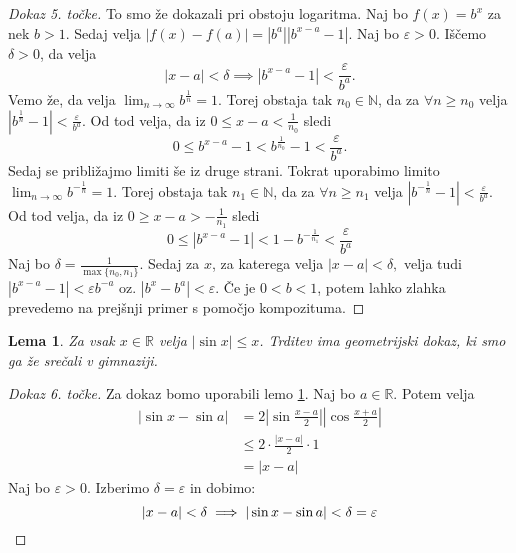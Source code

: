 \documentclass[10pt, a4paper]{article}
\newtheorem{lema}[izr]{Lema}
\newenvironment{noticeC}{%
  \tcolorbox[%
  notitle,
  empty,
  enhanced,  %
  breakable,
  coltext=black, 
  fontupper=\rmfamily,
  parbox=false,
  noparskip,
  sharp corners,
  boxrule=-1pt,  %
  frame hidden,
  left=7pt,  %
  right=7pt,
  top=5pt,
  bottom=5pt,
  before skip=2.5ex plus 2pt,
  after skip=2.5ex plus 2pt,
  overlay unbroken and last={%
  },
  ]}
{\endtcolorbox}
\newenvironment{dokaz}%
  {\begin{noticeC}\begin{proof}}%
  {\end{proof}\end{noticeC}}
\newcommand{\N}{\mathbb {N}}
\newcommand{\R}{\mathbb {R}}
\newcommand{\limzap}[1]{\lim_{n \to \infty} {#1}}
\begin{document}
\begin{dokaz}[Dokaz 5. točke]
            To smo že dokazali pri obstoju logaritma. Naj bo 
            $f(x) = b^x$ za nek $b >1$.
            Sedaj velja $|f(x) - f(a)| = |b^a||b^{x-a}-1|$.
            Naj bo $\varepsilon>0$. Iščemo $\delta>0$, da velja
            $$|x-a|<\delta \implies |b^{x-a}-1|<\frac{\varepsilon}{b^a}.$$ 
            Vemo že, da velja
                $\limzap{b^{\frac{1}{n}}} = 1.$
                Torej obstaja tak $n_0 \in \N$, da za $\forall n \geq n_0$ velja
                $|b^{\frac{1}{n}} - 1| < \frac{\varepsilon}{b^a}.$
                Od tod velja, da iz $0 \leq x-a < \frac{1}{n_0}$ sledi $$0 \leq b^{x-a} - 1 < b^{\frac{1}{n_0}} -1 < \frac{\varepsilon}{b^a}.$$
            Sedaj se približajmo limiti še iz druge strani. Tokrat uporabimo limito $\limzap{b^{-\frac{1}{n}}} = 1.$
                Torej obstaja tak $n_1 \in \N$, da za $\forall n \geq n_1$ velja
                $|b^{-\frac{1}{n}} - 1| < \frac{\varepsilon}{b^a}.$
                Od tod velja, da iz $0 \geq x-a > -\frac{1}{n_1}$ sledi $$0 \leq |b^{x-a} - 1| < 1 - b^{-\frac{1}{n_1}}  < \frac{\varepsilon}{b^a}$$
            Naj bo $\delta = \frac{1}{\max\{n_0, n_1\}}.$ Sedaj za $x$, za katerega velja
            $|x-a|<\delta,$ velja tudi
            $|b^{x-a} - 1|<\varepsilon b^{-a}$ oz. $|b^x - b^a| < \varepsilon$.
            Če je $0 < b < 1$, potem lahko zlahka prevedemo na prejšnji primer s pomočjo kompozituma.
        \end{dokaz}

            \begin{lema} 
                \label{lem:4}
                Za vsak $x \in \R$ velja
                $|\sin x| \leq x$. Trditev ima geometrijski dokaz, ki smo ga že srečali v gimnaziji.
            \end{lema}

        \begin{dokaz}[Dokaz 6. točke]
            Za dokaz bomo uporabili lemo \ref{lem:4}.
            Naj bo $a \in \R$. Potem velja
            \begin{align*}
                |\sin x - \sin a| &= 2|\sin {\frac{x-a}{2}}||\cos {\frac{x+a}{2}}|\\
                &\leq 2 \cdot \frac{|x-a|}{2} \cdot 1\\
                &= |x-a|
            \end{align*}
            Naj bo $\varepsilon>0.$ Izberimo $\delta = \varepsilon$ in dobimo:
            \begin{equation*}
                |x-a| < \delta \implies |\sin x - \sin a| < \delta = \varepsilon \qedhere
            \end{equation*}
        \end{dokaz}
\end{document}
